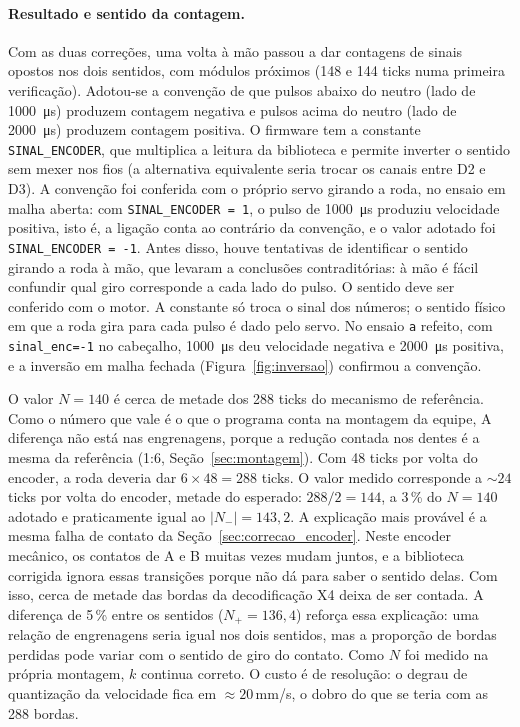 \documentclass[12pt]{article}
\begin{document}
\paragraph{Resultado e sentido da contagem.} Com as duas correções, uma volta à mão passou a dar contagens de sinais opostos nos dois sentidos, com módulos próximos (148 e 144 ticks numa primeira verificação). Adotou-se a convenção de que pulsos abaixo do neutro (lado de \SI{1000}{\micro\second}) produzem contagem negativa e pulsos acima do neutro (lado de \SI{2000}{\micro\second}) produzem contagem positiva. O firmware tem a constante \texttt{SINAL\_ENCODER}, que multiplica a leitura da biblioteca e permite inverter o sentido sem mexer nos fios (a alternativa equivalente seria trocar os canais entre D2 e D3). A convenção foi conferida com o próprio servo girando a roda, no ensaio em malha aberta: com \texttt{SINAL\_ENCODER = 1}, o pulso de \SI{1000}{\micro\second} produziu velocidade positiva, isto é, a ligação conta ao contrário da convenção, e o valor adotado foi \texttt{SINAL\_ENCODER = -1}. Antes disso, houve tentativas de identificar o sentido girando a roda à mão, que levaram a conclusões contraditórias: à mão é fácil confundir qual giro corresponde a cada lado do pulso. O sentido deve ser conferido com o motor. A constante só troca o sinal dos números; o sentido físico em que a roda gira para cada pulso é dado pelo servo. No ensaio \texttt{a} refeito, com \texttt{sinal\_enc=-1} no cabeçalho, \SI{1000}{\micro\second} deu velocidade negativa e \SI{2000}{\micro\second} positiva, e a inversão em malha fechada (Figura~\ref{fig:inversao}) confirmou a convenção.

O valor $N = 140$ é cerca de metade dos 288 ticks do mecanismo de referência. Como o número que vale é o que o programa conta na montagem da equipe, A diferença não está nas engrenagens, porque a redução contada nos dentes é a mesma da referência (1:6, Seção~\ref{sec:montagem}). Com 48 ticks por volta do encoder, a roda deveria dar $6 \times 48 = 288$ ticks. O valor medido corresponde a ${\sim}24$ ticks por volta do encoder, metade do esperado: $288/2 = 144$, a 3\,\% do $N = 140$ adotado e praticamente igual ao $|N_-| = 143{,}2$. A explicação mais provável é a mesma falha de contato da Seção~\ref{sec:correcao_encoder}. Neste encoder mecânico, os contatos de A e B muitas vezes mudam juntos, e a biblioteca corrigida ignora essas transições porque não dá para saber o sentido delas. Com isso, cerca de metade das bordas da decodificação X4 deixa de ser contada. A diferença de 5\,\% entre os sentidos ($N_+ = 136{,}4$) reforça essa explicação: uma relação de engrenagens seria igual nos dois sentidos, mas a proporção de bordas perdidas pode variar com o sentido de giro do contato. Como $N$ foi medido na própria montagem, $k$ continua correto. O custo é de resolução: o degrau de quantização da velocidade fica em ${\approx}20$\,mm/s, o dobro do que se teria com as 288 bordas.
\end{document}
